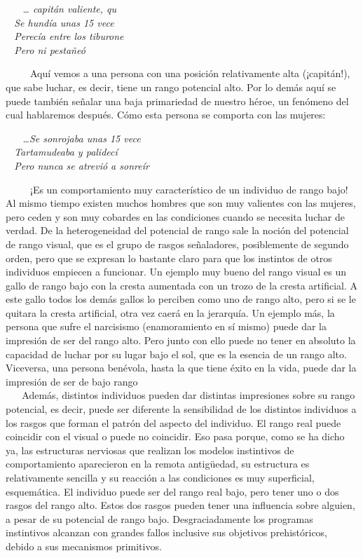 \emph{~ ~ \ldots{} capitán valiente, qu\\
\hspace*{0.333em} ~ Se hundía unas 15 vece\\
\hspace*{0.333em} ~ Perecía entre los tiburone\\
\hspace*{0.333em} ~ Pero ni pestañeó}

~ ~ ~ Aquí vemos a una persona con una posición relativamente alta
(¡capitán!), que sabe luchar, es decir, tiene un rango potencial alto.
Por lo demás aquí se puede también señalar una baja primariedad de
nuestro héroe, un fenómeno del cual hablaremos después. Cómo esta
persona se comporta con las mujeres:

\emph{~ ~ \ldots{}Se sonrojaba unas 15 vece\\
\hspace*{0.333em} ~ Tartamudeaba y palidecí\\
\hspace*{0.333em} ~ Pero nunca se atrevió a sonreír}

~ ~ ~ ¡Es un comportamiento muy característico de un individuo de rango
bajo! Al mismo tiempo existen muchos hombres que son muy valientes con
las mujeres, pero ceden y son muy cobardes en las condiciones cuando se
necesita luchar de verdad. De la heterogeneidad del potencial de rango
sale la noción del potencial de rango visual, que es el grupo de rasgos
señaladores, posiblemente de segundo orden, pero que se expresan lo
bastante claro para que los instintos de otros individuos empiecen a
funcionar. Un ejemplo muy bueno del rango visual es un gallo de rango
bajo con la cresta aumentada con un trozo de la cresta artificial. A
este gallo todos los demás gallos lo perciben como uno de rango alto,
pero si se le quitara la cresta artificial, otra vez caerá en la
jerarquía. Un ejemplo más, la persona que sufre el narcisismo
(enamoramiento en sí mismo) puede dar la impresión de ser del rango
alto. Pero junto con ello puede no tener en absoluto la capacidad de
luchar por su lugar bajo el sol, que es la esencia de un rango alto.
Viceversa, una persona benévola, hasta la que tiene éxito en la vida,
puede dar la impresión de ser de bajo rango\\
\hspace*{0.333em} ~ ~ Además, distintos individuos pueden dar distintas
impresiones sobre su rango potencial, es decir, puede ser diferente la
sensibilidad de los distintos individuos a los rasgos que forman el
patrón del aspecto del individuo. El rango real puede coincidir con el
visual o puede no coincidir. Eso pasa porque, como se ha dicho ya, las
estructuras nerviosas que realizan los modelos instintivos de
comportamiento aparecieron en la remota antigüedad, su estructura es
relativamente sencilla y su reacción a las condiciones es muy
superficial, esquemática. El individuo puede ser del rango real bajo,
pero tener uno o dos rasgos del rango alto. Estos dos rasgos pueden
tener una influencia sobre alguien, a pesar de su potencial de rango
bajo. Desgraciadamente los programas instintivos alcanzan con grandes
fallos inclusive sus objetivos prehistóricos, debido a sus mecanismos
primitivos.

